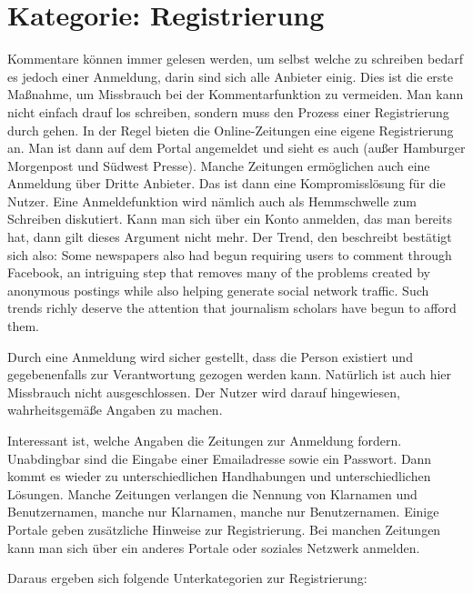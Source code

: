 

\section{Kategorie: \glqq Registrierung\grqq}

Kommentare können immer gelesen werden, um selbst welche zu schreiben bedarf es
jedoch einer Anmeldung, darin sind sich alle Anbieter einig. Dies ist die erste
Maßnahme, um Missbrauch bei der Kommentarfunktion zu vermeiden. Man kann nicht
einfach drauf los schreiben, sondern muss den Prozess einer Registrierung durch
gehen. In der Regel bieten die Online-Zeitungen eine eigene Registrierung an.
Man ist dann auf dem Portal angemeldet und sieht es auch (außer Hamburger
Morgenpost und Südwest Presse). Manche Zeitungen ermöglichen auch eine Anmeldung
über Dritte Anbieter. Das ist dann eine Kompromisslösung für die Nutzer. Eine
Anmeldefunktion wird nämlich auch als Hemmschwelle zum Schreiben diskutiert.
Kann man sich über ein Konto anmelden, das man bereits hat, dann gilt dieses
Argument nicht mehr. Der Trend, den \textcite[S.~69]{singer:2014} beschreibt
bestätigt sich also: \glqq Some newspapers also had begun requiring users to
comment through Facebook, an intriguing step that removes many of the problems
created by anonymous postings while also helping generate social network
traffic. Such trends richly deserve the attention that journalism scholars have
begun to afford them.\grqq

Durch eine Anmeldung wird sicher gestellt, dass die Person existiert und
gegebenenfalls zur Verantwortung gezogen werden kann.  Natürlich ist auch hier
Missbrauch nicht ausgeschlossen. Der Nutzer wird darauf hingewiesen,
wahrheitsgemäße Angaben zu machen. 

Interessant ist, welche Angaben die Zeitungen zur Anmeldung fordern. Unabdingbar
sind die Eingabe einer Emailadresse sowie ein Passwort. Dann kommt es wieder zu
unterschiedlichen Handhabungen und unterschiedlichen Lösungen. Manche Zeitungen
verlangen die Nennung von Klarnamen und Benutzernamen, manche nur Klarnamen,
manche nur Benutzernamen. Einige Portale geben zusätzliche Hinweise zur
Registrierung. Bei manchen Zeitungen kann man sich über ein anderes Portale oder
soziales Netzwerk anmelden.

Daraus ergeben sich folgende Unterkategorien zur Registrierung:

